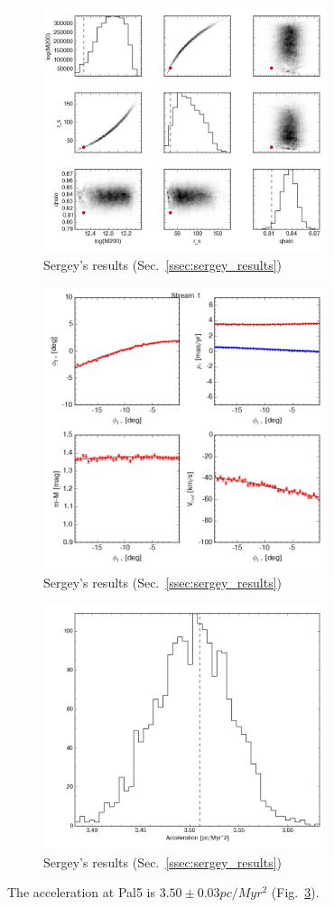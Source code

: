 \begin{figure}
\includegraphics[width=83mm]{./figures/sergey_results.png}
  \caption{Sergey's results (Sec.~\ref{ssec:sergey_results})}
  \label{plot_sergey_results}
\end{figure}

\begin{figure}
\includegraphics[width=83mm]{./figures/sergey_orbitfit.png}
  \caption{Sergey's results (Sec.~\ref{ssec:sergey_results})}
  \label{plot_sergey_orbitfit}
\end{figure}

\begin{figure}
\includegraphics[width=83mm]{./figures/sergey_acc.png}
  \caption{Sergey's results (Sec.~\ref{ssec:sergey_results})}
  \label{plot_sergey_acc}
\end{figure}

The acceleration at Pal5 is $3.50 \pm 0.03 pc/Myr^2$ (Fig.~\ref{plot_sergey_acc}).

